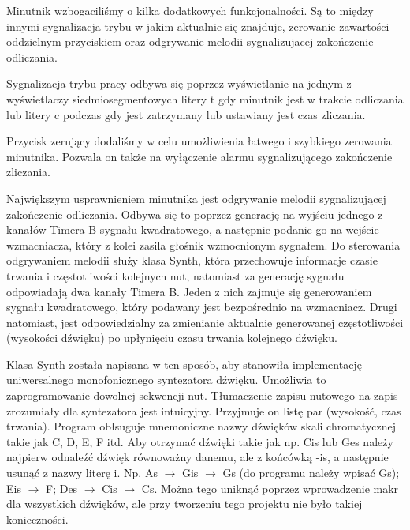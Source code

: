 \documentclass[fleqn]{article}
\begin{document}
Minutnik wzbogaciliśmy o kilka dodatkowych funkcjonalności. Są to między innymi sygnalizacja trybu w jakim aktualnie się znajduje, zerowanie zawartości oddzielnym przyciskiem oraz odgrywanie melodii sygnalizujacej zakończenie odliczania.

Sygnalizacja trybu pracy odbywa się poprzez wyświetlanie na jednym z wyświetlaczy siedmiosegmentowych litery t gdy minutnik jest w trakcie odliczania lub litery c podczas gdy jest zatrzymany lub ustawiany jest czas zliczania.

Przycisk zerujący dodaliśmy w celu umożliwienia łatwego i szybkiego zerowania minutnika. Pozwala on także na wyłączenie alarmu sygnalizującego zakończenie zliczania.

Największym usprawnieniem minutnika jest odgrywanie melodii sygnalizującej zakończenie odliczania. Odbywa się to poprzez generację na wyjściu jednego z kanałów Timera B sygnału kwadratowego, a następnie podanie go na wejście wzmacniacza, który z kolei zasila głośnik wzmocnionym sygnałem. Do sterowania odgrywaniem melodii służy klasa Synth, która przechowuje informacje czasie trwania i częstotliwości kolejnych nut, natomiast za generację sygnału odpowiadają dwa kanały Timera B. Jeden z nich zajmuje się generowaniem sygnału kwadratowego, który podawany jest bezpośrednio na wzmacniacz. Drugi natomiast, jest odpowiedzialny za zmienianie aktualnie generowanej częstotliwości (wysokości dźwięku) po upłynięciu czasu trwania kolejnego dźwięku.

Klasa Synth została napisana w ten sposób, aby stanowiła implementację uniwersalnego monofonicznego syntezatora dźwięku. Umożliwia to zaprogramowanie dowolnej sekwencji nut. Tłumaczenie zapisu nutowego na zapis zrozumiały dla syntezatora jest intuicyjny. Przyjmuje on listę par (wysokość, czas trwania). Program obłsuguje mnemoniczne nazwy dźwięków skali chromatycznej takie jak C, D, E, F itd. Aby otrzymać dźwięki takie jak np. Cis lub Ges należy najpierw odnaleźć dźwięk równoważny danemu, ale z końcówką -is, a następnie usunąć z nazwy literę i. Np. As $\rightarrow$ Gis $\rightarrow$ Gs (do programu należy wpisać Gs); Eis $\rightarrow$ F; Des $\rightarrow$ Cis $\rightarrow$ Cs. Można tego uniknąć poprzez wprowadzenie makr dla wszystkich dźwięków, ale przy tworzeniu tego projektu nie było takiej konieczności.
\end{document}
